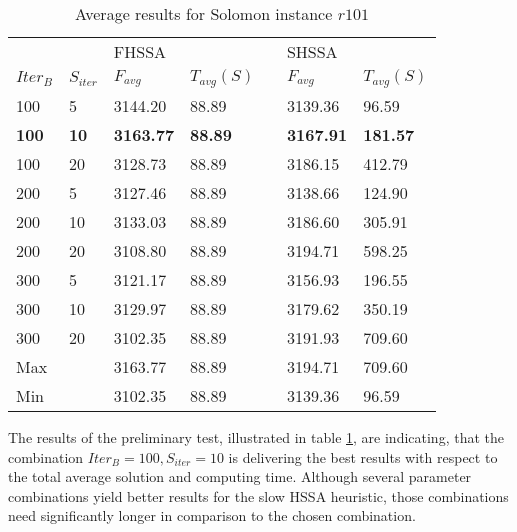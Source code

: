 \documentclass[final,5p,times,twocolumn]{elsarticle}
\begin{document}
{{{\begin{table}[htbp]
\centering
\caption{Average results for Solomon instance $r101$}
\begin{tabularx}{\linewidth}{X l l l l l l}
\hline 
&&\multicolumn{2}{l}{FHSSA}&& \multicolumn{2}{l}{SHSSA}\\
\cline{3-4}\cline{6-7}
$Iter_{B}$ & $S_{iter}$ & $F_{avg}$ & $T_{avg}(S)$ && $F_{avg}$ & $T_{avg}(S)$\\
\hline
100&5&3144.20&88.89&&3139.36&96.59\\
\textbf{100}&\textbf{10}&\textbf{3163.77}&\textbf{88.89}&&\textbf{3167.91}&\textbf{181.57}\\
100&20&3128.73&88.89&&3186.15&412.79\\
200&5&3127.46&88.89&&3138.66&124.90\\
200&10&3133.03&88.89&&3186.60&305.91\\
200&20&3108.80&88.89&&3194.71&598.25\\
300&5&3121.17&88.89&&3156.93&196.55\\
300&10&3129.97&88.89&&3179.62&350.19\\
300&20&3102.35&88.89&&3191.93&709.60\\
\hline
Max&&3163.77&88.89&&3194.71&709.60\\
Min&&3102.35&88.89&&3139.36&96.59\\
\hline
\end{tabularx}
\label{tab:ptOverall}
\end{table} 

The results of the preliminary test, illustrated in table \ref{tab:ptOverall}, are indicating, that the combination $Iter_{B}=100,S_{iter}=10$  is delivering the best results with respect to the total average solution and computing time. Although several parameter combinations yield better results for the slow HSSA heuristic, those combinations need significantly longer in comparison to the chosen combination. 

}}}
\end{document}
